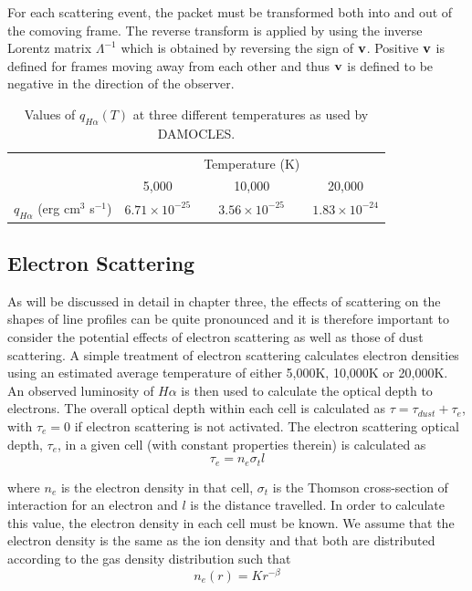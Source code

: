 For each scattering event, the packet must be transformed both into and out of the comoving frame. The reverse transform is applied by using the inverse Lorentz matrix $\Lambda^{-1}$ which is obtained by reversing the sign of $\bf{v}$.  Positive $\bf{v}$ is defined for frames moving away from each other and thus $\bf{v}$ is defined to be negative in the direction of the observer.

\begin{table}[htdp]
\caption{Values of $q_{H\alpha}(T)$ at three different temperatures as used by DAMOCLES.}
\begin{center}
\def\arraystretch{1.5}
\begin{tabular}{ c c c c}
\toprule
&&Temperature (K) & \\
\cmidrule{2-4}
& 5,000 & 10,000 & 20,000  \\
\midrule
$q_{H\alpha}$ (erg cm$^3$ s$^{-1}$)  & $6.71\times 10^{-25}$	&$3.56\times 10^{-25}$	&$1.83\times 10^{-24}$  \\
\bottomrule
\end{tabular}
\end{center}
\label{tb:q}
        \end{table}%

        \subsection{Electron Scattering}
        \label{scn:ES}

        As will be discussed in detail in chapter three, the effects of scattering on the shapes of line profiles can be quite pronounced and it is therefore important to consider the potential effects of electron scattering as well as those of dust scattering.  A simple treatment of electron scattering calculates electron densities using an estimated average temperature of either 5,000K, 10,000K or 20,000K.  An observed luminosity of $H{\alpha}$ is then used to calculate the optical depth to electrons.  The overall optical depth within each cell is calculated as $\tau = \tau_{dust}+\tau_{e}$, with $\tau_{e}=0$ if electron scattering is not activated.  The electron scattering optical depth, $\tau_e$, in a given cell (with constant properties therein) is calculated as 
        \begin{equation}
        \tau_e =  n_e \sigma_t l
        \end{equation}
        
        \noindent where $n_e$ is the electron density in that cell,  $\sigma_t$ is the Thomson cross-section of interaction for an electron and $l$ is the distance travelled.	
        In order to calculate this value, the electron density in each cell must be known.  We assume that the electron density is the same as the ion density and that both are distributed according to the gas density distribution such that 
        \begin{equation}
        \label{eqn:es_distn}
        n_e(r) = Kr^{-\beta}
        \end{equation}

